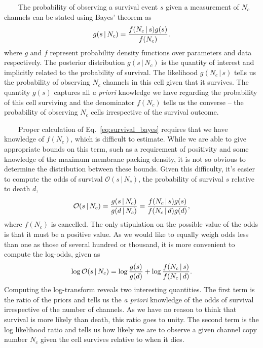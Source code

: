 ~~~~The
probability
of
observing
a
survival
event
\(s\)
given
a
measurement
of
\(N_c\)
channels
can be
stated
using
Bayes'
theorem
as
\begin{equation}
g(s\,\vert\, N_c) = {f(N_c\,\vert\, s)g(s) \over f(N_c)}.
\label{eq:survival_bayes}\end{equation}
where
\(g\)
and
\(f\)
represent
probability
density
functions
over
parameters
and
data
respectively.
The
posterior
distribution
\(g(s\,\vert\, N_c)\)
is the
quantity
of
interest
and
implicitly
related
to the
probability
of
survival.
The
likelihood
\(g(N_c\,\vert\, s)\)
tells
us the
probability
of
observing
\(N_c\)
channels
in
this
cell
given
that
it
survives.
The
quantity
\(g(s)\)
captures
all
\emph{a
priori}
knowledge
we
have
regarding
the
probability
of
this
cell
surviving
and
the
denominator
\(f(N_c)\)
tells
us the
converse
-- the
probability
of
observing
\(N_c\)
cells
irrespective
of the
survival
outcome.

~~~~Proper
calculation
of
Eq.~\ref{eq:survival_bayes}
requires
that
we
have
knowledge
of
\(f(N_c)\),
which
is
difficult
to
estimate.
While
we are
able
to
give
appropriate
bounds
on
this
term,
such
as a
requirement
of
positivity
and
some
knowledge
of the
maximum
membrane
packing
density,
it is
not so
obvious
to
determine
the
distribution
between
these
bounds.
Given
this
difficulty,
it's
easier
to
compute
the
odds
of
survival
\(\mathcal{O}(s\,\vert\, N_c)\),
the
probability
of
survival
\(s\)
relative
to
death
\(d\),
\begin{equation}
\mathcal{O}(s\,\vert\, N_c) = {g(s\,\vert\,N_c) \over g(d\,\vert\, N_c)} = {f(N_c\,\vert\, s)g(s) \over f(N_c\,\vert\,d)g(d)},
\label{eq:odds_definition}\end{equation}
where
\(f(N_c)\)
is
cancelled.
The
only
stipulation
on the
possible
value
of the
odds
is
that
it
must
be a
positive
value.
As we
would
like
to
equally
weigh
odds
less
than
one as
those
of
several
hundred
or
thousand,
it is
more
convenient
to
compute
the
log-odds,
given
as
\begin{equation}
\log \mathcal{O}(s\,\vert\,N_c)= \log {g(s) \over g(d)} + \log {f(N_c \,\vert\, s )\over f(N_c\,\vert\, d)}.
\label{eq:log_odds}\end{equation}
Computing
the
log-transform
reveals
two
interesting
quantities.
The
first
term
is the
ratio
of the
priors
and
tells
us the
\emph{a
priori}
knowledge
of the
odds
of
survival
irrespective
of the
number
of
channels.
As we
have
no
reason
to
think
that
survival
is
more
likely
than
death,
this
ratio
goes
to
unity.
The
second
term
is the
log
likelihood
ratio
and
tells
us how
likely
we are
to
observe
a
given
channel
copy
number
\(N_c\)
given
the
cell
survives
relative
to
when
it
dies.

